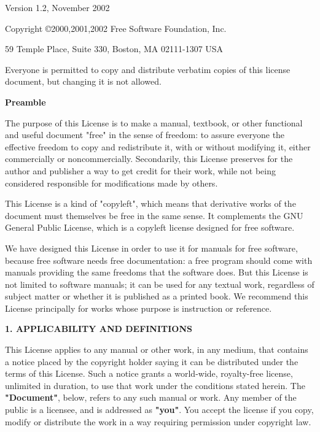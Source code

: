 \documentclass[12pt]{book}
\begin{document}
 \begin{center}

       Version 1.2, November 2002


 Copyright \copyright 2000,2001,2002  Free Software Foundation, Inc.
 
 \bigskip
 
     59 Temple Place, Suite 330, Boston, MA  02111-1307  USA
  
 \bigskip
 
 Everyone is permitted to copy and distribute verbatim copies
 of this license document, but changing it is not allowed.
\end{center}


\begin{center}
{\bf\large Preamble}
\end{center}

The purpose of this License is to make a manual, textbook, or other
functional and useful document "free" in the sense of freedom: to
assure everyone the effective freedom to copy and redistribute it,
with or without modifying it, either commercially or noncommercially.
Secondarily, this License preserves for the author and publisher a way
to get credit for their work, while not being considered responsible
for modifications made by others.

This License is a kind of "copyleft", which means that derivative
works of the document must themselves be free in the same sense.  It
complements the GNU General Public License, which is a copyleft
license designed for free software.

We have designed this License in order to use it for manuals for free
software, because free software needs free documentation: a free
program should come with manuals providing the same freedoms that the
software does.  But this License is not limited to software manuals;
it can be used for any textual work, regardless of subject matter or
whether it is published as a printed book.  We recommend this License
principally for works whose purpose is instruction or reference.


\begin{center}
{\Large\bf 1. APPLICABILITY AND DEFINITIONS}
\end{center}

This License applies to any manual or other work, in any medium, that
contains a notice placed by the copyright holder saying it can be
distributed under the terms of this License.  Such a notice grants a
world-wide, royalty-free license, unlimited in duration, to use that
work under the conditions stated herein.  The \textbf{"Document"}, below,
refers to any such manual or work.  Any member of the public is a
licensee, and is addressed as \textbf{"you"}.  You accept the license if you
copy, modify or distribute the work in a way requiring permission
under copyright law.
\end{document}
